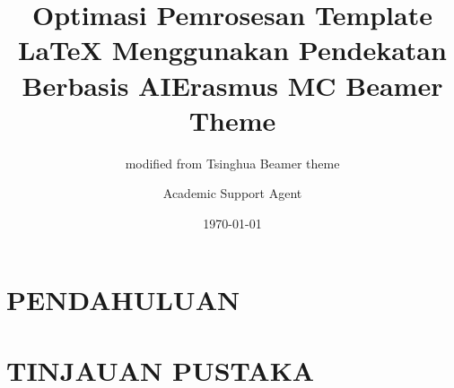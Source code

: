 \documentclass{beamer}
\title{Optimasi Pemrosesan Template LaTeX Menggunakan Pendekatan Berbasis AI}
\author{Academic Support Agent}
\date{\today}
\begin{document}
\maketitle

\begin{abstract}

\end{abstract}

\chapter{PENDAHULUAN}


\chapter{TINJAUAN PUSTAKA}


\title{\textbf{Erasmus MC Beamer Theme}}
\subtitle{modified from Tsinghua Beamer theme}


\usepackage{hyperref}
\usepackage[T1]{fontenc}

\usepackage{latexsym,amsmath,amssymb,amsfonts,multicol,booktabs,calligra}
\usepackage{graphicx,pstricks,listings,stackengine}
\usepackage[backend=biber,style=nejm]{biblatex}

\renewcommand{\cite}{\parencite}

\usepackage{erasmusmc}

\end{document}
